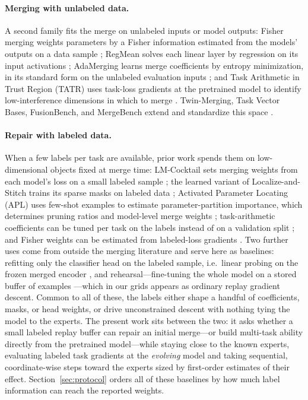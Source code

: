 \documentclass{article} %
\begin{document}
\paragraph{Merging with unlabeled data.}
A second family fits the merge on unlabeled inputs or model outputs: Fisher merging weights parameters by a Fisher information estimated from the models' outputs on a data sample \citep{matena2022fisher}; RegMean solves each linear layer by regression on its input activations \citep{jin2023regmean}; AdaMerging learns merge coefficients by entropy minimization, in its standard form on the unlabeled evaluation inputs \citep{yang2024adamerging}; and Task Arithmetic in Trust Region (TATR) uses task-loss gradients at the pretrained model to identify low-interference dimensions in which to merge \citep{sun2025tatr}. Twin-Merging, Task Vector Bases, FusionBench, and MergeBench extend and standardize this space \citep{lu2024twin,zeng2025taskvectorbases,tang2024fusionbench,he2025mergebench}.

\paragraph{Repair with labeled data.}
When a few labels per task are available, prior work spends them on low-dimensional objects fixed at merge time: LM-Cocktail sets merging weights from each model's loss on a small labeled sample \citep{xiao2024lmcocktail}; the learned variant of Localize-and-Stitch trains its sparse masks on labeled data \citep{he2024localize}; Activated Parameter Locating (APL) uses few-shot examples to estimate parameter-partition importance, which determines pruning ratios and model-level merge weights \citep{kong2024apl}; task-arithmetic coefficients can be tuned per task on the labels instead of on a validation split \citep{ilharco2022taskarithmetic}; and Fisher weights can be estimated from labeled-loss gradients \citep{matena2022fisher}. Two further uses come from outside the merging literature and serve here as baselines: refitting only the classifier head on the labeled sample, i.e.\ linear probing on the frozen merged encoder \citep{alain2016probes,kumar2022lpft}, and rehearsal---fine-tuning the whole model on a stored buffer of examples \citep{robins1995rehearsal,chaudhry2019tiny}---which in our grids appears as ordinary replay gradient descent. Common to all of these, the labels either shape a handful of coefficients, masks, or head weights, or drive unconstrained descent with nothing tying the model to the experts. The present work sits between the two: it asks whether a small labeled replay buffer can repair an initial merge---or build multi-task ability directly from the pretrained model---while staying close to the known experts, evaluating labeled task gradients at the \emph{evolving} model and taking sequential, coordinate-wise steps toward the experts sized by first-order estimates of their effect. Section~\ref{sec:protocol} orders all of these baselines by how much label information can reach the reported weights.
\end{document}
